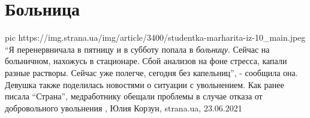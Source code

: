  
 
 
 
 
\chapter{Больница}
\label{sec:slova.bolnica}

\ifcmt
  pic https://img.strana.ua/img/article/3400/studentka-marharita-iz-10_main.jpeg
\fi
\enquote{Я перенервничала в пятницу и в субботу попала в \emph{больницу}. Сейчас на
больничном, нахожусь в стационаре. Сбой анализов на фоне стресса, капали разные
растворы. Сейчас уже полегче, сегодня без капельниц}, - сообщила она.  Девушка
также поделилась новостями о ситуации с увольнением. Как ранее писала \enquote{Страна},
медработнику обещали проблемы в случае отказа от добровольного увольнения
, Юлия Корзун, strana.ua, 23.06.2021
